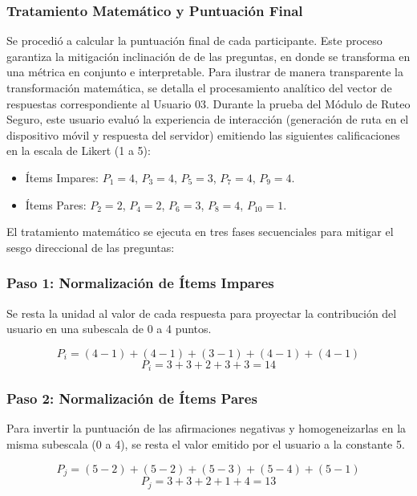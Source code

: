 \subsubsection{Tratamiento Matemático y Puntuación Final}
Se procedió a calcular la puntuación final de cada participante. Este proceso garantiza la mitigación inclinación de de las preguntas, en donde se transforma en una métrica en conjunto e interpretable. Para ilustrar de manera transparente la transformación matemática, se detalla el procesamiento analítico del vector de respuestas correspondiente al Usuario 03. Durante la prueba del Módulo de Ruteo Seguro, este usuario evaluó la experiencia de interacción (generación de ruta en el dispositivo móvil y respuesta del servidor) emitiendo las siguientes calificaciones en la escala de Likert (1 a 5):

\begin{itemize}
    \item Ítems Impares: $P_1=4$, $P_3=4$, $P_5=3$, $P_7=4$, $P_9=4$.
    \item Ítems Pares: $P_2=2$, $P_4=2$, $P_6=3$, $P_8=4$, $P_{10}=1$.
\end{itemize}

El tratamiento matemático se ejecuta en tres fases secuenciales para mitigar el sesgo direccional de las preguntas:
\subsubsection{Paso 1: Normalización de Ítems Impares}
Se resta la unidad al valor de cada respuesta para proyectar la contribución del usuario en una subescala de 0 a 4 puntos.

\begin{equation}
P_{i}= (4-1) + (4-1) + (3-1) + (4-1) + (4-1)
\end{equation}
\begin{equation}
P_{i}= 3 + 3 + 2 + 3 + 3 = 14
\end{equation}

\subsubsection{Paso 2: Normalización de Ítems Pares} 
Para invertir la puntuación de las afirmaciones negativas y homogeneizarlas en la misma subescala (0 a 4), se resta el valor emitido por el usuario a la constante 5.

\begin{equation}
P_{j}= (5-2) + (5-2) + (5-3) + (5-4) + (5-1)
\end{equation}
\begin{equation}
P_{j}= 3 + 3 + 2 + 1 + 4 = 13
\end{equation}

